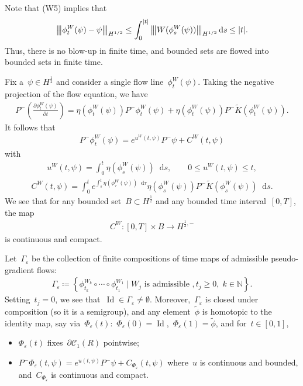 \documentclass[11pt,final]{amsart}
\newcommand{\tnorm}[1]{%
  \left\vert\kern-0.3ex\left\vert\kern-0.3ex\left\vert #1 \right\vert\kern-0.3ex\right\vert\kern-0.3ex\right\vert
}
\newcommand{\parenthesis}[1]{\left(#1\right)} %
\newcommand{\braces}[1]{\left\{#1\right\}} %
\newcommand{\dd}{\mathop{}\!\mathrm{d}}
\newcommand{\eps}{\varepsilon}
\newcommand{\p}{\partial}
\DeclareMathOperator{\id}{Id}
\begin{document}
Note that (W5) implies that
\begin{align}
    \tnorm{\phi^W_t(\psi)-\psi}_{H^{1/2}}\leq \int_0^{|t|} \tnorm{W(\phi^W_s(\psi))}_{H^{1/2}}\dd{s} \leq |t|.
\end{align}
Thus, there is no blow-up in finite time, and bounded sets are flowed into bounded sets in finite time.

Fix a~$\psi\in H^{\frac{1}{2}}$ and consider a single flow line~$\phi^W_t(\psi)$.
Taking the negative projection of the flow equation, we have
\begin{align}
    P^-\parenthesis{\frac{\p \phi^W_t(\psi)}{\p t}}
    = \eta(\phi^W_t(\psi))P^-\phi^W_t(\psi)
    + \eta(\phi^W_t(\psi))P^-\widetilde{K}(\phi^W_t(\psi)).
\end{align}
It follows that
\begin{align}
    P^-\phi^W_t(\psi)
    = e^{u^W(t,\psi)}P^-\psi + C^W(t,\psi)
\end{align}
with
\begin{align}
    u^W(t,\psi)=\int_0^t \eta(\phi^W_s(\psi))\dd s, \qquad  0\leq u^W(t,\psi)\leq t ,
\end{align}
\begin{align}
    C^W(t,\psi)
    = \int_0^t e^{\int_s^t \eta(\phi^W_\tau(\psi))\dd \tau } \eta(\phi^W_s(\psi))P^-\widetilde{K}(\phi^W_s(\psi))\dd{s}.
\end{align}
We see that for any bounded set~$B\subset H^{\frac{1}{2}}$ and any bounded time interval~$[0,T]$, the map
\begin{align}
    C^W\colon [0,T]\times B \to H^{\frac{1}{2},-}
\end{align}
is continuous and compact.



Let~$\Gamma_\eps$ be the collection of finite compositions of time maps of admissible pseudo-gradient flows:
\begin{align}
    \Gamma_\eps\coloneqq \braces{ \phi^{W_k}_{t_k}\circ \cdots\circ \phi^{W_1}_{t_1} \mid W_j \mbox{ is admissible }, t_j\geq 0, \; k\in\mathbb{N} }.
\end{align}
Setting~$t_j=0$, we see that~$\id\in\Gamma_\eps\neq \emptyset$.
Moreover,~$\Gamma_\eps$ is closed under composition (so it is a semigroup), and any element~$\tilde{\phi}$ is homotopic to the identity map, say via~$\Phi_\eps(t)$:~$\Phi_\eps(0)=\id$,~$\Phi_\eps(1)=\tilde{\phi}$, and for~$t\in [0,1]$,
\begin{itemize}
    \item[(1)] $\Phi_\eps(t)$ fixes~$\p\mathscr{C}_1(R)$ pointwise;
    \item[(2)] $P^-\Phi_\eps(t,\psi)=e^{u(t,\psi)}P^-\psi+ C_{\Phi_\eps}(t,\psi)$ where~$u$ is continuous and bounded, and~$C_{\Phi_\eps}$ is continuous and compact.
\end{itemize}
\end{document}
